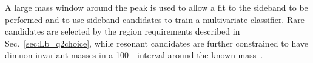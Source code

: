 A large mass window around the \Lb peak is used to allow a fit to the sideband to be performed 
and to use sideband candidates to train a multivariate classifier.
Rare candidates are selected by the \qsq region requirements described in Sec.~\ref{sec:Lb_q2choice},
while resonant candidates are further constrained to have dimuon invariant masses
in a 100~\mevcc~interval around the known \jpsi mass~\cite{PDG2014}.

